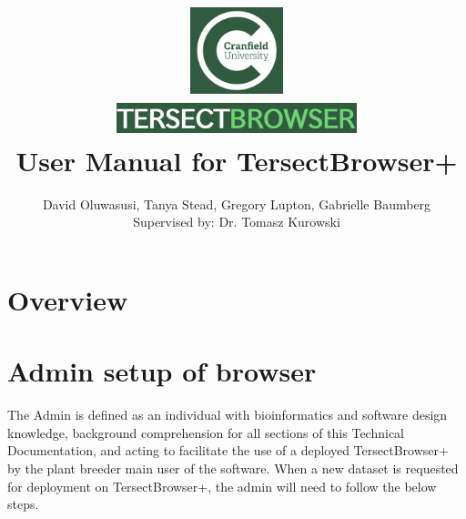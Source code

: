 \documentclass[12pt]{article}
\title{
{\includegraphics[width=3cm, height=2.5cm]{Cran.jpg}}
\\
\includegraphics[width=7cm, height=1cm]{TB.jpg}
\\
{User Manual for TersectBrowser+}
}
\author{David Oluwasusi, Tanya Stead, Gregory Lupton, Gabrielle Baumberg \\ Supervised by: Dr. Tomasz Kurowski}
\begin{document}
\sloppy %

\maketitle

\section{Overview}

\section{Admin setup of browser}
The Admin is defined as an individual with bioinformatics and software design knowledge, background comprehension for all sections of this Technical Documentation, and acting to facilitate the use of a deployed TersectBrowser+ by the plant breeder main user of the software. When a new dataset is requested for deployment on TersectBrowser+, the admin will need to follow the below steps.
\end{document}
